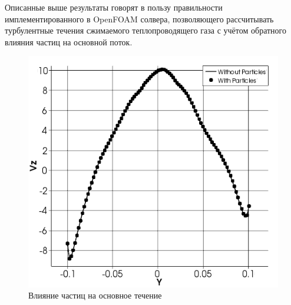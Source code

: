 Описанные выше результаты говорят в пользу правильности имплементированного в OpenFOAM солвера, позволяющего рассчитывать турбулентные течения сжимаемого теплопроводящего газа с учётом обратного влияния частиц на основной поток.
\begin{figure}[h]
	\centering
	\includegraphics[scale=0.75]{parcelsInteraction}
	\caption{Влияние частиц на основное течение}
	\label{fig:parcelsInteraction}
\end{figure}